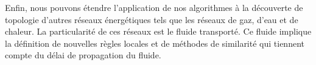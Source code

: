 Enfin, nous pouvons \'etendre l'application de nos algorithmes \`a la d\'ecouverte de topologie d'autres r\'eseaux \'energ\'etiques tels que les r\'eseaux de gaz, d'eau et de chaleur. La particularit\'e de ces r\'eseaux est le fluide transport\'e. Ce fluide implique la d\'efinition de nouvelles r\`egles locales et de m\'ethodes de similarit\'e qui tiennent compte du d\'elai de propagation du fluide. 
